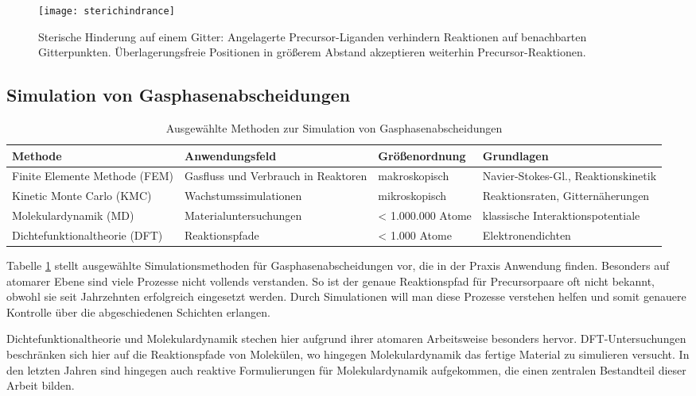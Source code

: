 \begin{figure}
  \centering
  \texttt{[image: sterichindrance]}
  \caption[Sterische Hinderung]{Sterische Hinderung auf einem Gitter:
    Angelagerte Precursor-Liganden verhindern Reaktionen auf benachbarten Gitterpunkten.
    Überlagerungsfreie Positionen in größerem Abstand akzeptieren weiterhin Precursor-Reaktionen.
  }
  \label{fig:steric}
\end{figure}

\subsection{Simulation von Gasphasenabscheidungen}

\begin{table}
  \centering
  \begin{tabularx}{\textwidth}{XXXX}
    \hline
    Methode & Anwendungsfeld & Größenordnung & Grundlagen \\
    \hline
    Finite Elemente Methode (FEM) & Gasfluss und Verbrauch in Reaktoren & makroskopisch & Navier-Stokes-Gl., Reaktionskinetik \\
    Kinetic Monte Carlo (KMC) & Wachstums\-simulationen & mikroskopisch & Reaktionsraten, Gitternäherungen \\
    Molekular\-dynamik (MD) & Material\-unter\-suchungen & < 1.000.000 Atome & klassische Interaktionspotentiale \\
    Dichte\-funktional\-theorie (DFT) & Reaktionspfade & < 1.000 Atome & Elektronendichten \\
    \hline
  \end{tabularx}
  \caption[Ausgewählte Methoden zur Simulation von Gasphasenabscheidungen]{Ausgewählte Methoden zur Simulation von Gasphasenabscheidungen}
  \label{tab:deposition-simulations}
\end{table}

Tabelle \ref{tab:deposition-simulations} stellt ausgewählte Simulationsmethoden für Gasphasenabscheidungen vor, die in der Praxis Anwendung finden.
Besonders auf atomarer Ebene sind viele Prozesse nicht vollends verstanden.
So ist der genaue Reaktionspfad für Precursorpaare oft nicht bekannt, obwohl sie seit Jahrzehnten erfolgreich eingesetzt werden.
Durch Simulationen will man diese Prozesse verstehen helfen und somit genauere Kontrolle über die abgeschiedenen Schichten erlangen.

Dichtefunktionaltheorie und Molekulardynamik stechen hier aufgrund ihrer atomaren Arbeitsweise besonders hervor.
DFT-Untersuchungen beschränken sich hier auf die Reaktionspfade von Molekülen, wo hingegen Molekulardynamik das fertige Material zu simulieren versucht.
In den letzten Jahren sind hingegen auch reaktive Formulierungen für Molekulardynamik aufgekommen, die einen zentralen Bestandteil dieser Arbeit bilden.
